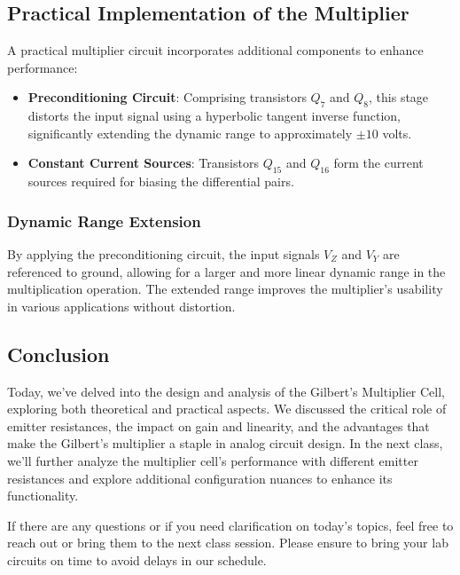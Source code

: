 \documentclass[a4paper,9pt,twoside,openany,twocolumn]{memoir}
\begin{document}
\subsection{Practical Implementation of the Multiplier}
A practical multiplier circuit incorporates additional components to enhance performance:
\begin{itemize}
    \item \textbf{Preconditioning Circuit}: Comprising transistors $Q_7$ and $Q_8$, this stage distorts the input signal using a hyperbolic tangent inverse function, significantly extending the dynamic range to approximately $\pm 10$ volts.
    \item \textbf{Constant Current Sources}: Transistors $Q_{15}$ and $Q_{16}$ form the current sources required for biasing the differential pairs.
\end{itemize}

\subsubsection{Dynamic Range Extension}
By applying the preconditioning circuit, the input signals $V_Z$ and $V_Y$ are referenced to ground, allowing for a larger and more linear dynamic range in the multiplication operation. The extended range improves the multiplier's usability in various applications without distortion.

\subsection{Conclusion}
Today, we've delved into the design and analysis of the Gilbert's Multiplier Cell, exploring both theoretical and practical aspects. We discussed the critical role of emitter resistances, the impact on gain and linearity, and the advantages that make the Gilbert's multiplier a staple in analog circuit design. In the next class, we'll further analyze the multiplier cell's performance with different emitter resistances and explore additional configuration nuances to enhance its functionality.

If there are any questions or if you need clarification on today's topics, feel free to reach out or bring them to the next class session. Please ensure to bring your lab circuits on time to avoid delays in our schedule.
\end{document}
